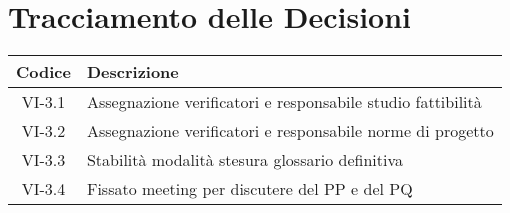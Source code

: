 \section*{Tracciamento delle Decisioni}

\begin{center}
	\begin{longtable}{|c|p{14.5cm}|}
	\hline
	\rowcolor{lighter-grayer}
	\textbf{Codice} & \textbf{Descrizione} \\
	\hline
	\endfirsthead

	\hline
	VI-3.1 & Assegnazione verificatori e responsabile studio fattibilità \\
	VI-3.2 & Assegnazione verificatori e responsabile norme di progetto\\
	VI-3.3 & Stabilità modalità stesura glossario definitiva \\
	VI-3.4 & Fissato meeting per discutere del PP e del PQ \\
	\hline

	\end{longtable}
\end{center}